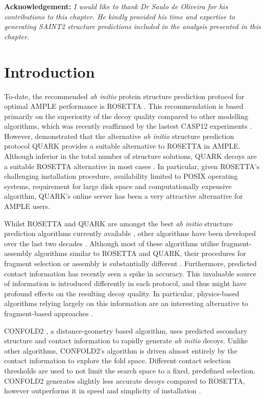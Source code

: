 \textbf{Acknowledgement: }\textit{I would like to thank Dr Saulo de Oliveira for his contributions to this chapter. He kindly provided his time and expertise to generating SAINT2 structure predictions included in the analysis presented in this chapter.}

\section{Introduction}
To-date, the recommended \textit{ab initio} protein structure prediction protocol for optimal AMPLE performance is ROSETTA \cite{Keegan2015-zb, Thomas2017-sh, Thomas2015-wu, Bibby2012-lm}. This recommendation is based primarily on the superiority of the decoy quality compared to other modelling algorithms, which was recently reaffirmed by the lastest CASP12 experiments \cite{Abriata2018-lu,Ovchinnikov2017-wp}. However, \textcite{Keegan2015-zb} demonstrated that the alternative \textit{ab initio} structure prediction protocol QUARK provides a suitable alternative to ROSETTA in AMPLE. Although inferior in the total number of structure solutions, QUARK decoys are a suitable ROSETTA alternative in most cases \cite{Keegan2015-zb}. In particular, given ROSETTA's challenging installation procedure, availability limited to POSIX operating systems, requirement for large disk space and computationally expensive algorithm, QUARK's online server has been a very attractive alternative for AMPLE users.

Whilst ROSETTA and QUARK are amongst the best \textit{ab initio} structure prediction algorithms currently available \cite{Abriata2018-lu}, other algorithms have been developed over the last two decades \cite[e.g.,][]{Jones2001-mc,Ellis2010-zs,Adhikari2015-lb,Xu2012-jf,Marks2011-os,Wang2016-ar}. Although most of these algorithms utilise fragment-assembly algorithms similar to ROSETTA and QUARK, their procedures for fragment selection or assembly is substantially different \cite{Ellis2010-zs,Jones2001-mc}. Furthermore, predicted contact information has recently seen a spike in accuracy. This invaluable source of information is introduced differently in each protocol, and thus might have profound effects on the resulting decoy quality. In particular, physics-based algorithms relying largely on this information are an interesting alternative to fragment-based approaches \cite{Adhikari2015-lb,Marks2011-os,Wang2016-ar}.

CONFOLD2 \cite{Adhikari2018-lj}, a distance-geometry based algorithm, uses predicted secondary structure and contact information to rapidly generate \textit{ab initio} decoys. Unlike other algorithms, CONFOLD2's algorithm is driven almost entirely by the contact information to explore the fold space. Different contact selection thresholds are used to not limit the search space to a fixed, predefined selection. CONFOLD2 generates slightly less accurate decoys compared to ROSETTA, however outperforms it in speed and simplicity of installation \cite{Adhikari2018-lj,Michel2017-xh}.

